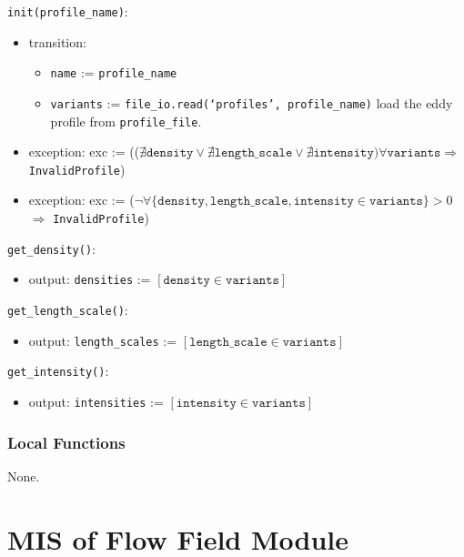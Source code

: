 \documentclass[12pt, titlepage]{article}
\begin{document}
\noindent \texttt{init(profile\_name)}:
\begin{itemize}
\item transition:
  \begin{itemize}
    \item \texttt{name} := \texttt{profile\_name}
    \item \texttt{variants} := \texttt{file\_io.read(`profiles', profile\_name)} load the eddy profile from \texttt{profile\_file}.
  \end{itemize}
\item exception: exc := (($\nexists \texttt{density} \vee \nexists \texttt{length\_scale} \vee \nexists \texttt{intensity}) \forall \texttt{variants} \Rightarrow$ \texttt{InvalidProfile})
\item exception: exc := ($\neg \forall \{\texttt{density}, \texttt{length\_scale}, \texttt{intensity} \in \texttt{variants}\} >0$ $\Rightarrow$ \texttt{InvalidProfile})
\end{itemize}

\noindent \texttt{get\_density()}:
\begin{itemize}
\item output: \texttt{densities} := $[\texttt{density} \in \texttt{variants}]$
\end{itemize}

\noindent \texttt{get\_length\_scale()}:
\begin{itemize}
\item output: \texttt{length\_scales} := $[\texttt{length\_scale} \in \texttt{variants}]$
\end{itemize}

\noindent \texttt{get\_intensity()}:
\begin{itemize}
\item output: \texttt{intensities} := $[\texttt{intensity} \in \texttt{variants}]$
\end{itemize}

\subsubsection{Local Functions}
None.


\newpage
\section{MIS of Flow Field Module} \label{mFlow} 
\end{document}
